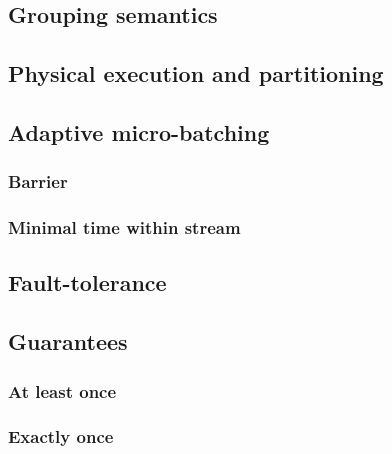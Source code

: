 
\label  {fs-implementation-section}

\subsection{Grouping semantics}

\subsection{Physical execution and partitioning}

\subsection{Adaptive micro-batching}

\subsubsection{Barrier}

\subsubsection{Minimal time within stream}

\subsection{Fault-tolerance}

\subsection{Guarantees}

\subsubsection{At least once}

\subsubsection{Exactly once}



